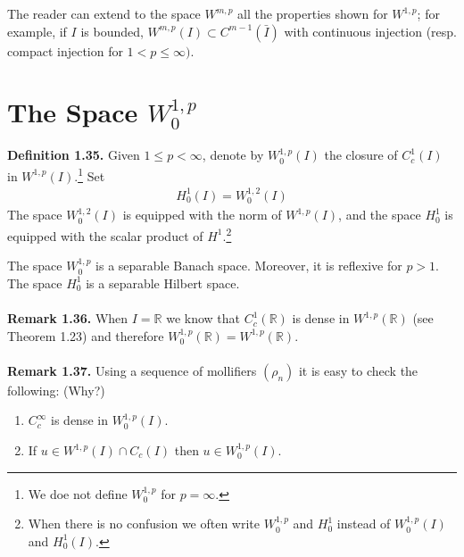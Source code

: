 \documentclass[a4paper,oneside]{article}
\numberwithin{equation}{section}
\begin{document}
The reader can extend to the space $W^{m,p}$ all the properties shown for $W^{1,p}$; for example, if $I$ is bounded, $W^{m,p}\left(I\right) \subset C^{m-1}\left(\bar{I}\right)$ with continuous injection (resp. compact injection for $1<p\le \infty)$.
\section{The Space $W_0^{1,p}$} 
\textbf{Definition 1.35.} Given $1\le p<\infty$, denote by $W_0^{1,p}\left(I\right)$ the closure of $C_c^1\left(I\right)$ in $W^{1,p}\left(I\right)$.\footnote{We doe not define $W_0^{1,p}$ for $p=\infty$.} Set
\begin{align}
H_0^1\left( I \right) = W_0^{1,2}\left( I \right)
\end{align}
The space $W_0^{1,2}\left(I\right)$ is equipped with the norm of $W^{1,p}\left(I\right)$, and the space $H_0^1$ is equipped with the scalar product of $H^1$.\footnote{When there is no confusion we often write $W_0^{1,p}$ and $H_0^1$ instead of $W_0^{1,p}\left(I\right)$ and $H_0^1\left(I\right)$.}

The space $W_0^{1,p}$ is a separable Banach space. Moreover, it is reflexive for $p>1$. The space $H_0^1$ is a separable Hilbert space.\\
\\
\textbf{Remark 1.36.} When $I=\mathbb{R}$ we know that $C_c^1\left(\mathbb{R}\right)$ is dense in $W^{1,p}\left(\mathbb{R}\right)$ (see Theorem 1.23) and therefore $W_0^{1,p}\left(\mathbb{R}\right)=W^{1,p}\left(\mathbb{R}\right)$.\\
\\
\textbf{Remark 1.37.} Using a sequence of mollifiers $\left(\rho _n\right)$ it is easy to check the following: (Why?)
\begin{enumerate}
\item $C_c^{\infty}$ is dense in $W_0^{1,p}\left(I\right)$.
\item If $u \in {W^{1,p}}\left( I \right) \cap {C_c}\left( I \right)$ then $u\in W_0^{1,p}\left(I\right)$. 
\end{enumerate}
\end{document}
